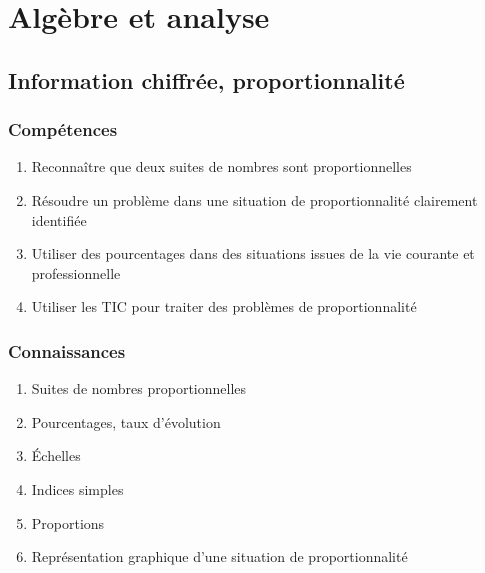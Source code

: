 \documentclass[12pt,a4paper]{article}
\begin{document}
\section{Algèbre et analyse}

\subsection{Information chiffrée, proportionnalité}
\begin{multicols}{2}
	\subsubsection*{Compétences}
	\begin{enumerate}
		\item Reconnaître que deux suites de nombres sont proportionnelles
		\item Résoudre un problème dans une situation de proportionnalité clairement identifiée
		\item Utiliser des pourcentages dans des situations issues de la vie courante et professionnelle
		\item Utiliser les TIC pour traiter des problèmes de proportionnalité
	\end{enumerate}
	
	\subsubsection*{Connaissances}
	\begin{enumerate}
		\item Suites de nombres proportionnelles
		\item Pourcentages, taux d'évolution
		\item \'Echelles
		\item Indices simples
		\item Proportions
		\item Représentation graphique d'une situation de proportionnalité
	\end{enumerate}
\end{multicols}
\end{document}
